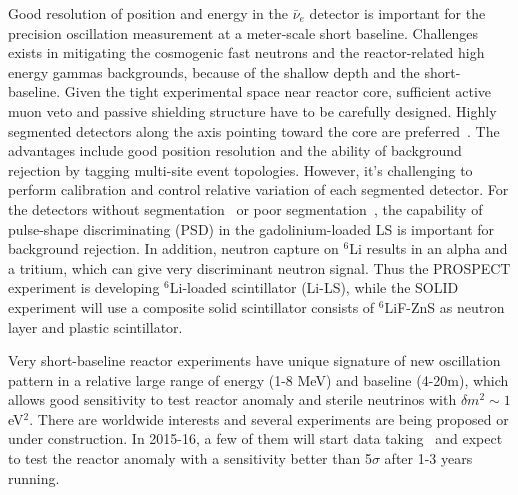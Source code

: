 Good resolution of position and energy in the $\bar\nu_e$ detector is important for the precision oscillation measurement at a meter-scale short baseline. Challenges exists in mitigating the cosmogenic fast neutrons and the reactor-related high energy gammas backgrounds, because of the shallow depth and the short-baseline. Given the tight experimental space near reactor core, sufficient active muon veto and passive shielding structure have to be carefully designed. Highly segmented detectors along the axis pointing toward the core are preferred~\cite{PROSPECT,DANSS,SoLid,HANARO}. The advantages include good position resolution and the ability of background rejection by tagging multi-site event topologies. However, it's challenging to perform calibration and control relative variation of each segmented detector. For the detectors without segmentation~\cite{NUCIFER-2010,NEUTRINO4-2014,POSEIDON} or poor segmentation~\cite{NUCIFER-2014}, the capability of pulse-shape discriminating (PSD) in the gadolinium-loaded LS is important for background rejection. In addition, neutron capture on $^6$Li results in an alpha and a tritium, which can give very discriminant neutron signal. Thus the PROSPECT experiment is developing $^6$Li-loaded scintillator (Li-LS), while the SOLID experiment will use a composite solid scintillator consists of $^6$LiF-ZnS as neutron layer and plastic scintillator.

Very short-baseline reactor experiments have unique signature of new oscillation pattern in a relative large range of energy (1-8 MeV) and baseline (4-20m), which allows good sensitivity to test reactor anomaly and sterile neutrinos with $\delta m^2\sim1$eV$^2$. There are worldwide interests and several experiments are being proposed or under construction. In 2015-16, a few of them will start data taking~\cite{Lhuillier-Neutrino14} and expect to test the reactor anomaly with a sensitivity better than 5$\sigma$ after 1-3 years running.


